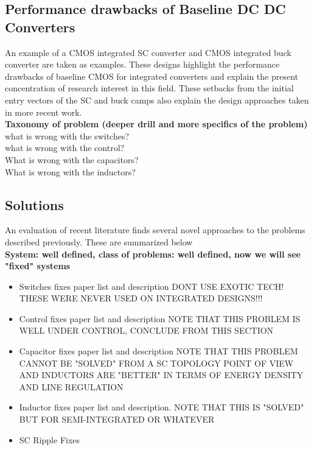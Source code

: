 \documentclass[letterpaper,twocolumn,10pt]{article}
\begin{document}
\subsection{Performance drawbacks of Baseline DC DC Converters}
An example of a CMOS integrated SC converter \cite{Viraj2007} and CMOS integrated buck converter \cite{Alimadadi2008} are taken as examples. These designs highlight the performance drawbacks of baseline CMOS for integrated converters and explain the present concentration of research interest in this field. These setbacks from the initial entry vectors of the SC and buck camps also explain the design approaches taken in more recent work.\\ 
\textbf{Taxonomy of problem (deeper drill and more specifics of the problem)}\\
what is wrong with the switches?\\ %
what is wrong with the control? \\
What is wrong with the capacitors?\\
What is wrong with the inductors?\\

\subsection{Solutions}
An evaluation of recent literature finds several novel approaches to the problems described previously. These are summarized below\\


\textbf{System: well defined, class of problems: well defined, now we will see "fixed" systems}\\
\begin{itemize}
\item{Switches fixes paper list and description DONT USE EXOTIC TECH! THESE WERE NEVER USED ON INTEGRATED DESIGNS!!!}
\item{Control fixes paper list and description NOTE THAT THIS PROBLEM IS WELL UNDER CONTROL, CONCLUDE FROM THIS SECTION}
\item{Capacitor fixes paper list and description NOTE THAT THIS PROBLEM CANNOT BE "SOLVED" FROM A SC TOPOLOGY POINT OF VIEW AND INDUCTORS ARE "BETTER" IN TERMS OF ENERGY DENSITY AND LINE REGULATION}
\item{Inductor fixes paper list and description. NOTE THAT THIS IS "SOLVED" BUT FOR SEMI-INTEGRATED OR WHATEVER}
\item{SC Ripple Fixes} %
\end{itemize}
\end{document}
